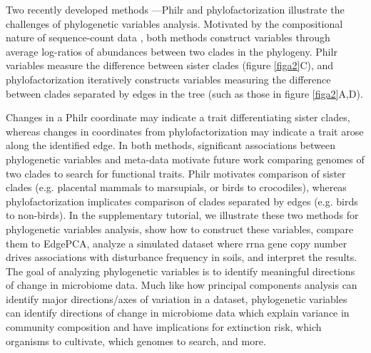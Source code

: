 Two recently developed methods —Ph\gls{ilr} \cite{Silverman2016-he} and phylofactorization \cite{Washburne2017-up} illustrate the challenges of phylogenetic variables analysis. Motivated by the compositional nature of sequence-count data \cite{aitchison_statistics} \cite{gloor_compositional_analysis}, both methods construct variables through average log-ratios of abundances between two clades in the phylogeny.  Ph\gls{ilr} variables measure the difference between sister clades (figure \ref{figa2}C), and phylofactorization iteratively constructs variables measuring the difference between clades separated by edges in the tree (such as those in figure \ref{figa2}A,D).\par
Changes in a Ph\gls{ilr} coordinate may indicate a trait differentiating sister clades, whereas changes in coordinates from phylofactorization may indicate a trait arose along the identified edge. In both methods, significant associations between phylogenetic variables and meta-data motivate future work comparing genomes of two clades to search for functional traits. Ph\gls{ilr} motivates comparison of sister clades (e.g. placental mammals to marsupials, or birds to crocodiles), whereas phylofactorization implicates comparison of clades separated by edges (e.g. birds to non-birds). In the supplementary tutorial, we illustrate these two methods for phylogenetic variables analysis, show how to construct these variables, compare them to EdgePCA, analyze a simulated dataset where \gls{rrna} gene copy number drives associations with disturbance frequency in soils\cite{rrna_operon}, and interpret the results.
The goal of analyzing phylogenetic variables is to identify meaningful directions of change in microbiome data. Much like how principal components analysis can identify major directions/axes of variation in a dataset, phylogenetic variables can identify directions of change in microbiome data which explain variance in community composition and have implications for extinction risk, which organisms to cultivate, which genomes to search, and more.
